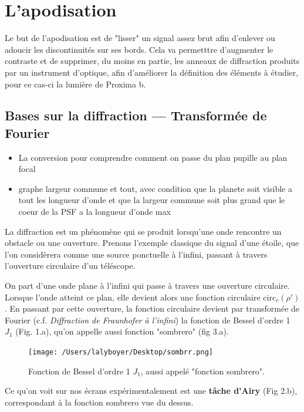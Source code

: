 \section{\centering L'apodisation}

Le but de l'apodisation est de "lisser" un signal assez brut afin d'enlever ou adoucir les discontinuités sur ses bords. 
Cela va permetttre d'augmenter le contraste et de supprimer, du moins en partie, les anneaux de diffraction produits par un instrument d'optique, afin d'améliorer la définition des éléments à étudier, pour ce cas-ci la lumière de Proxima b.

\subsection{Bases sur la diffraction — Transformée de Fourier}

\begin{itemize}
\item La conversion pour comprendre comment on passe du plan pupille au plan focal
    
    \item graphe largeur commune et tout, avec condition que la planete soit visible a tout les longueur d’onde et que la largeur commune soit plus grand que le coeur de la PSF a la longueur d’onde max 
\end{itemize}

La diffraction est un phénomène qui se produit lorsqu'une onde rencontre un obstacle ou une ouverture. Prenons l'exemple classique du signal d'une étoile, que l'on considèrera comme une source ponctuelle à l'infini, passant à travers l'ouverture circulaire d'un téléscope. 

On part d'une onde plane à l'infini qui passe à travers une ouverture circulaire. Lorsque l'onde atteint ce plan, elle devient alors une fonction circulaire $\text{circ}_r(\rho')$.
En passant par cette ouverture, la fonction circulaire devient par transformée de Fourier (c.f. \emph{Diffraction de Fraunhofer à l'infini}) la fonction de Bessel d'ordre 1 $J_1$ (Fig. 1.a), qu'on appelle aussi fonction "sombrero" (fig 3.a).

\begin{figure}
    \centering
    \texttt{[image: /Users/lalyboyer/Desktop/sombrr.png]}
    \caption{Fonction de Bessel d'ordre 1 $J_1$, aussi appelé "fonction sombrero".}
\end{figure}

Ce qu'on voit sur nos écrans expérimentalement est une \textbf{tâche d'Airy} (Fig 2.b), correspondant à la fonction sombrero vue du dessus.

